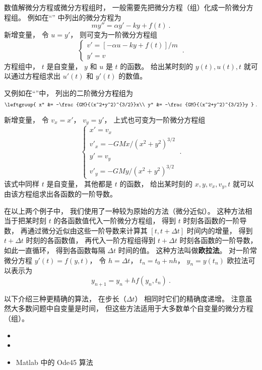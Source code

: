 

数值解微分方程或微分方程组时， 一般需要先把微分方程（组）化成一阶微分方程组。 例如在“” 中列出的微分方程为
\begin{equation}
m y'' = \alpha y' - ky + f(t)~.
\end{equation}
新增变量， 令 $u = y'$， 则可变为一阶微分方程组
\begin{equation}
\begin{cases}
v' = [-\alpha u - ky + f(t)]/m\\
y' = v
\end{cases}~.
\end{equation}
方程组中， $t$ 是自变量， $y$ 和 $u$ 是 $t$ 的函数。 给出某时刻的 $y(t), u(t), t$ 就可以通过方程组求出 $u'(t)$ 和 $y'(t)$ 的数值。

又例如在“”中， 列出的二阶微分方程组为
\begin{equation}
\leftgroup{
x'' &= -\frac{GM}{(x^2+y^2)^{3/2}}x\\
y'' &= -\frac{GM}{(x^2+y^2)^{3/2}}y
}~.\end{equation}

新增变量， 令 $v_x = x'$， $v_y = y'$， 上式也可变为一阶微分方程组
\begin{equation}\label{eq_OdeNum_4}
\begin{cases}
x' = v_x\\
v'_x = -GMx/(x^2 + y^2)^{3/2}\\
y' = v_y\\
v'_y = -GMy/(x^2 + y^2)^{3/2}
\end{cases}~.
\end{equation}
该式中同样 $t$ 是自变量， 其他都是 $t$ 的函数， 给出某时刻的 $x, y, v_x, v_y, t$ 就可以由该方程组求出各函数的一阶导数。

在以上两个例子中， 我们使用了一种较为原始的方法（微分近似）。 这种方法相当于把某时刻 $t$ 的各函数值代入一阶微分方程组， 得到 $t$ 时刻各函数的一阶导数， 再通过微分近似由这些一阶导数来计算其 $[t, t + \Delta t]$ 时间内的增量， 得到 $t +\Delta t$ 时刻的各函数值， 再代入一阶方程组得到 $t +\Delta t$ 时刻各函数的一阶导数， 如此一直循环， 得到各函数每隔 $\Delta t$ 时间的值。 这种方法叫做\textbf{欧拉法}。 对一阶常微分方程 $y'(t) = f(y, t)$， 令 $h = \Delta t$， $t_n = t_0 + nh$， $y_n = y(t_n)$ 欧拉法可以表示为
\begin{equation}\label{eq_OdeNum_5}
y_{n+1} = y_n + h f(y_n, t_n)~.
\end{equation}

以下介绍三种更精确的算法， 在步长（$\Delta t$） 相同时它们的精确度递增。 注意虽然大多数问题中自变量是时间， 但这些方法适用于大多数单个自变量的微分方程（组）。

\begin{itemize}
\item {}
\item {}
\item Matlab 中的 Ode45 算法
\end{itemize}












